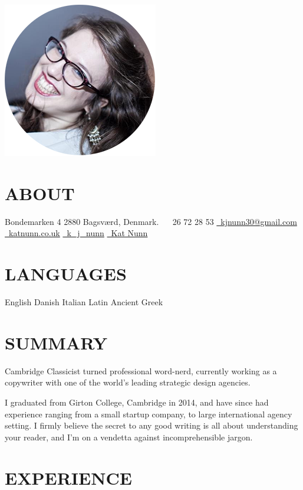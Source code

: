 \documentclass[]{friggeri-cv}
\begin{document}
{}

\begin{aside}
	\includegraphics[width=.66\textwidth]{../img/profile.png}
	\section{ABOUT}
	Bondemarken 4
	2880 Bagsværd,
	Denmark.
	~
	\faPhone~26 72 28 53
	\href{mailto:kjnunn30@gmail.com}{\faEnvelope~kjnunn30@gmail.com}
	\href{https://katnunn.co.uk}{\faGlobe~katnunn.co.uk}
	\href{https://twitter.com/k\_j\_nunn}{\faTwitter~k\_j\_nunn}
	\href{http://uk.linkedin.com/in/katnunn/}{\faLinkedin~Kat Nunn}
	\section{LANGUAGES}
	English
	Danish
	Italian
	Latin
	Ancient Greek
\end{aside}

\section{SUMMARY}
Cambridge Classicist turned professional word-nerd, currently working as a copywriter with one of the world's leading strategic \mbox{design} agencies.

I graduated from Girton College, Cambridge in 2014, and have since had experience ranging from a small startup company, to large international agency setting. I firmly believe the secret to any good writing is all about understanding your reader, and I'm on a vendetta against incomprehensible jargon.

\section{EXPERIENCE}
\end{document}
